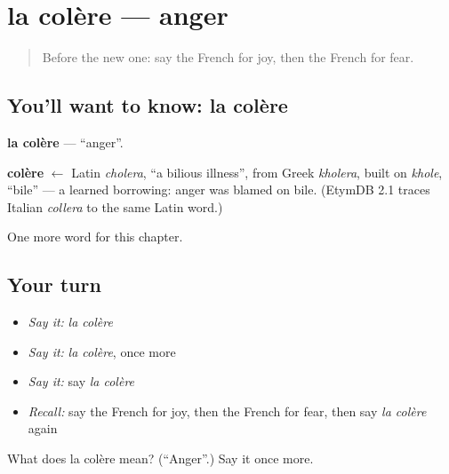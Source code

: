 \section[la colère]{la colère — anger}

\label{lesson:FR-C55-colere}



\begin{quote}
Before the new one: say the French for joy, then the French for fear.
\end{quote}

\subsection*{You'll want to know: la colère}
\textbf{la colère} — \textquotedblleft{}anger\textquotedblright{}.

\begin{cousinweb}
\textbf{colère} $\leftarrow$ Latin \emph{cholera}, \textquotedblleft{}a bilious illness\textquotedblright{}, from Greek \emph{kholera}, built on \emph{khole}, \textquotedblleft{}bile\textquotedblright{} — a learned borrowing: anger was blamed on bile. (EtymDB 2.1 traces Italian \emph{collera} to the same Latin word.)
\end{cousinweb}

\begin{grammarlens}[title={What you've built}]
One more word for this chapter.
\end{grammarlens}

\subsection*{Your turn}
\begin{itemize}
\raggedright
  \item \emph{Say it:} \emph{la colère}
  \item \emph{Say it:} \emph{la colère}, once more
  \item \emph{Say it:} say \emph{la colère}
  \item \emph{Recall:} say the French for joy, then the French for fear, then say \emph{la colère} again
\end{itemize}

\begin{tcolorbox}[breakable,colback=teal!4,colframe=teal!35!black,title={Before you move on}]
What does la colère mean? (\textquotedblleft{}Anger\textquotedblright{}.) Say it once more.
\end{tcolorbox}
